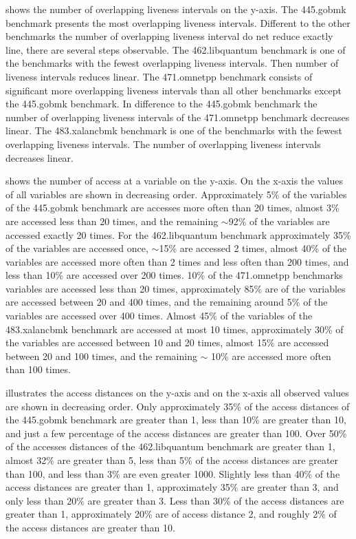\documentclass[onecolumn, openright, master, english, signatures]{dbrgrptt}
\begin{document}
 shows the number of overlapping liveness intervals on the y-axis.
The 445.gobmk benchmark presents the most overlapping liveness intervals. Different to the other benchmarks the number of overlapping liveness interval do net reduce exactly line, there are several steps observable.
The 462.libquantum benchmark is one of the benchmarks with the fewest overlapping liveness intervals. Then number of liveness intervals reduces linear.
The 471.omnetpp benchmark consists of significant more overlapping liveness intervals than all other benchmarks except the 445.gobmk benchmark. In difference to the 445.gobmk benchmark the number of overlapping liveness intervals of the 471.omnetpp benchmark decreases linear.
The 483.xalancbmk benchmark is one of the benchmarks with the fewest overlapping liveness intervals. The number of overlapping liveness intervals decreases linear.

 shows the number of access at a variable on the y-axis.
On the x-axis the values of all variables are shown in decreasing order.
Approximately 5\% of the variables of the 445.gobmk benchmark are accesses more often than 20 times, almost 3\% are accessed less than 20 times, and the remaining $\sim$92\% of the variables are accessed exactly 20 times.
For the 462.libquantum benchmark approximately 35\% of the variables are accessed once, $\sim$15\% are accessed 2 times, almost 40\% of the variables are accessed more often than 2 times and less often than 200 times, and less than 10\% are accessed over 200 times.
10\% of the 471.omnetpp benchmarks variables are accessed less than 20 times, approximately 85\% are of the variables are accessed between 20 and 400 times, and the remaining around 5\% of the variables are accessed over 400 times.
Almost 45\% of the variables of the 483.xalancbmk benchmark are accessed at most 10 times, approximately 30\% of the variables are accessed between 10 and 20 times, almost 15\% are accessed between 20 and 100 times, and the remaining $\sim$ 10\% are accessed more often than 100 times.

 illustrates the access distances on the y-axis and on the x-axis all observed values are shown in decreasing order.
Only approximately 35\% of the access distances of the 445.gobmk benchmark are greater than 1, less than 10\% are greater than 10, and just a few percentage of the access distances are greater than 100.
Over 50\% of the accesses distances of the 462.libquantum benchmark are greater than 1, almost 32\% are greater than 5, less than 5\% of the access distances are greater than 100, and less than 3\% are even greater 1000.
Slightly less than 40\% of the access distances are greater than 1, approximately 35\% are greater than 3, and only less than 20\% are greater than 3.
Less than 30\% of the access distances are greater than 1, approximately 20\% are of access distance 2, and roughly 2\% of the access distances are greater than 10.
\end{document}
